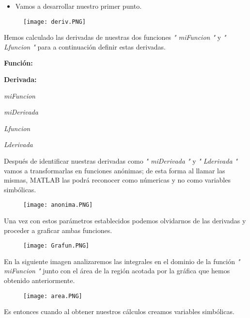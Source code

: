 \documentclass[letterpaper]{article}
\begin{document}
\begin{itemize}
    \item Vamos a desarrollar nuestro primer punto.
\end{itemize}
\begin{figure}[H]
    \centering
    \texttt{[image: deriv.PNG]}        
\end{figure}
\begin{justify}
    Hemos calculado las derivadas de nuestras dos funciones \textit{" miFuncion "} y \textit{" Lfuncion "} para a continuación
    definir estas derivadas.
\end{justify}
\begin{multicols}{2}
    \textbf{Función:}

    \textbf{Derivada:}
\end{multicols}
\begin{multicols}{2}
    \textit{miFuncion}

    \textit{miDerivada}   
\end{multicols}
\begin{multicols}{2}
    \textit{Lfuncion}

    \textit{Lderivada}   
\end{multicols}

\vspace{\baselineskip}
\newpage

\begin{justify}
    Después de identificar nuestras derivadas como \textit{" miDerivada "} y \textit{" Lderivada "} vamos
    a transformarlas en funciones anónimas; de esta forma al llamar las mismas, MATLAB las podrá reconocer como númericas y 
    no como variables simbólicas.
\end{justify}
\begin{figure}[H]
    \centering
    \texttt{[image: anonima.PNG]}        
\end{figure}
\begin{justify}
    Una vez con estos parámetros establecidos podemos olvidarnos de las derivadas y proceder a graficar ambas funciones.
\end{justify}
\begin{figure}[H]
    \centering
    \texttt{[image: Grafun.PNG]}        
\end{figure}

\vspace{\baselineskip}
\newpage
\begin{justify}
    En la siguiente imagen analizaremos las integrales en
    el dominio de la función \textit{" miFuncion "} junto con el área de la región acotada por la gráfica que hemos obtenido anteriormente.
\end{justify}
\begin{figure}[H]
    \centering
    \texttt{[image: area.PNG]}        
\end{figure}
\begin{justify}
   Es entonces cuando al obtener nuestros cálculos creamos variables simbólicas.
\end{justify}
\end{document}
